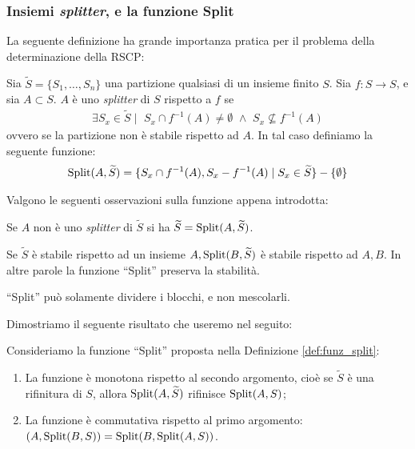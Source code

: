 \subsubsection{Insiemi \emph{splitter}, e la funzione Split}
La seguente definizione ha grande importanza pratica per il problema della determinazione della RSCP:
\begin{definition}
    \label{def:funz_split}
    Sia $\widetilde{S} = \{S_1,\dots,S_n\}$ una partizione qualsiasi di un insieme finito $S$. Sia $f: S \to S$, e sia $A \subset S$. $A$ è uno \emph{splitter} di $S$ rispetto a $f$ se
    \begin{gather*}
        \exists S_x \in \widetilde{S} \mid \,\, S_x \cap f^{-1}(A) \neq \emptyset \,\,\land\,\, S_x \not\subseteq f^{-1}(A)
    \end{gather*}
    ovvero se la partizione non è stabile rispetto ad $A$. In tal caso definiamo la seguente funzione:
    \begin{gather*}
        \textup{Split}(A,\widetilde{S}) = \{S_x \cap f^{-1}(A), S_x - f^{-1}(A) \mid S_x \in \widetilde{S}\} - \{\emptyset\}
    \end{gather*}
\end{definition}
Valgono le seguenti osservazioni sulla funzione appena introdotta:
\begin{observation}
    Se $A$ non è uno \emph{splitter} di $\widetilde{S}$ si ha $\widetilde{S} = \textup{Split}(A,\widetilde{S})$.
\end{observation}
\begin{observation}
    \label{obs:split_eredita}
    Se $\widetilde{S}$ è stabile rispetto ad un insieme $A, \textup{Split}(B,\widetilde{S})$ è stabile rispetto ad $A,B$. In altre parole la funzione ``Split'' preserva la stabilità.
\end{observation}
\begin{proof2}
    ``Split'' può solamente dividere i blocchi, e non mescolarli.
\end{proof2}
Dimostriamo il seguente risultato che useremo nel seguito:
\begin{theorem}
    \label{theo:split_properties}
    Consideriamo la funzione ``Split'' proposta nella Definizione \ref{def:funz_split}:
    \begin{enumerate}
        \item La funzione è monotona rispetto al secondo argomento, cioè se $\widetilde{S}$ è una rifinitura di $S$, allora $\textup{Split}(A,\widetilde{S})$ rifinisce $\textup{Split}(A,S)$;
        \item La funzione è commutativa rispetto al primo argomento: \splitfunc$(A,\textup{Split}(B,S)) = \textup{Split}(B, \textup{Split}(A,S))$.
    \end{enumerate}
\end{theorem}

